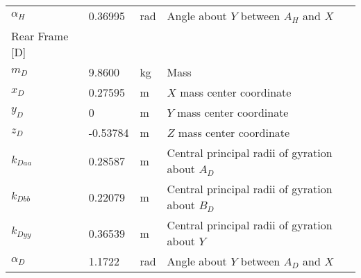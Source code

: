 \documentclass{bmd2019a}
\begin{document}
\begin{table}
\begin{tabular}{llll}
    $\alpha_H$ & 0.36995 & \si{\radian} & Angle about $Y$ between $A_H$ and $X$ \\
    Rear Frame [D] & & \\
    \midrule
    $m_D$ &  9.8600 & \si{\kilogram}    & Mass \\
    $x_D$ &  0.27595 & \si{\meter}      & $X$ mass center coordinate \\
    $y_D$ & 0 & \si{\meter}             & $Y$ mass center coordinate \\
    $z_D$ & -0.53784 & \si{\meter}      & $Z$ mass center coordinate \\
    $k_{Daa}$ &  0.28587 & \si{\meter}  & Central principal radii of gyration about $A_D$ \\
    $k_{Dbb}$ &  0.22079 & \si{\meter}  & Central principal radii of gyration about $B_D$ \\
    $k_{Dyy}$ &  0.36539 & \si{\meter}  & Central principal radii of gyration about $Y$ \\
    $\alpha_D$ &  1.1722 & \si{\radian} & Angle about $Y$ between $A_D$ and $X$ \\
    \bottomrule
  \end{tabular}
\end{table}
\end{document}

